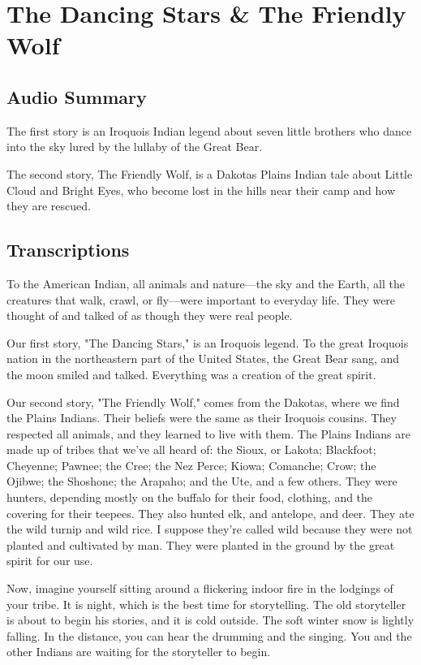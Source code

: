 \section{The Dancing Stars \& The Friendly Wolf}

\subsection{Audio Summary}

The first story is an Iroquois Indian legend about seven little brothers who dance into the sky lured by the lullaby of the Great Bear.

The second story, The Friendly Wolf, is a Dakotas Plains Indian tale about Little Cloud and Bright Eyes, who become lost in the hills near their camp and how they are rescued.

\subsection{Transcriptions}

To the American Indian, all animals and nature—the sky and the Earth, all the creatures that walk, crawl, or fly—were important to everyday life. They were thought of and talked of as though they were real people.

Our first story, "The Dancing Stars," is an Iroquois legend. To the great Iroquois nation in the northeastern part of the United States, the Great Bear sang, and the moon smiled and talked. Everything was a creation of the great spirit.

Our second story, "The Friendly Wolf," comes from the Dakotas, where we find the Plains Indians. Their beliefs were the same as their Iroquois cousins. They respected all animals, and they learned to live with them. The Plains Indians are made up of tribes that we've all heard of: the Sioux, or Lakota; Blackfoot; Cheyenne; Pawnee; the Cree; the Nez Perce; Kiowa; Comanche; Crow; the Ojibwe; the Shoshone; the Arapaho; and the Ute, and a few others. They were hunters, depending mostly on the buffalo for their food, clothing, and the covering for their teepees. They also hunted elk, and antelope, and deer. They ate the wild turnip and wild rice. I suppose they're called wild because they were not planted and cultivated by man. They were planted in the ground by the great spirit for our use.

Now, imagine yourself sitting around a flickering indoor fire in the lodgings of your tribe. It is night, which is the best time for storytelling. The old storyteller is about to begin his stories, and it is cold outside. The soft winter snow is lightly falling. In the distance, you can hear the drumming and the singing. You and the other Indians are waiting for the storyteller to begin.

